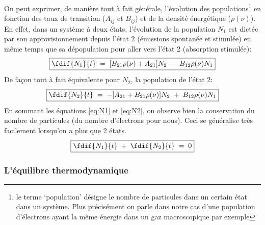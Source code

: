 On peut exprimer, de manière tout à fait générale, l'évolution des populations\footnote{le terme `population' désigne le nombre de particules dans un certain état dans un système. Plus précisément on parle dans notre cas d'une population d'électrons ayant la même énergie dans un gaz macroscopique par exemple} en fonction des taux de transition ($A_{ij}$ et $B_{ij}$) et de la densité énergétique ($\rho(\nu)$).\\
En effet, dans un système à deux états, l'évolution de la population $N_1$ est dictée par son approvisionnement depuis l'état 2 (émissions spontanée et stimulée) en même temps que sa dépopulation pour aller vers l'état 2 (absorption stimulée):
\begin{equation}
\boxed{
    \fdif{N_1}{t}
    \eq  [B_{21}\rho(\nu) + A_{21}]N_2 \;-\; B_{12} \rho(\nu)N_1
    }
    \label{eq:N2}
\end{equation}
De façon tout à fait équivalente pour $N_2$, la population de l'état 2:
\begin{equation}
\boxed{
    \fdif{N_2}{t}
    \eq - [A_{21} + B_{21} \rho(\nu)]N_2 \;+\; B_{12}\rho(\nu)N_1 
    \label{eq:N1}
    }
\end{equation}
En sommant les équations \ref{eq:N1} et \ref{eq:N2}, on observe bien la conservation du nombre de particules (du nombre d'électrons pour nous). Ceci se généralise très facilement lorsqu'on a plus que 2 états.
\begin{equation}
\boxed{
    \fdif{N_1}{t}\;+\;\fdif{N_2}{t} \eq 0
    }
\end{equation}



\subsubsection{L'équilibre thermodynamique}



